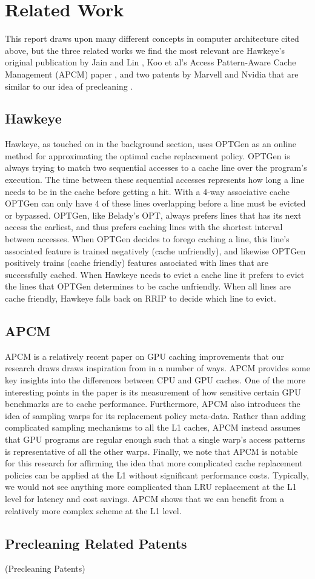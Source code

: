 \chapter{Related Work}

This report draws upon many different concepts in computer architecture cited above, but the three related works we find the most relevant are Hawkeye’s original publication by Jain and Lin \cite{hawkeye}, Koo et al’s Access Pattern-Aware Cache Management (APCM) paper \cite{apcm}, and two patents by Marvell and Nvidia that are similar to our idea of precleaning \cite{preclean_cpu,preclean_nvidia_patent}.

\section{Hawkeye}
Hawkeye, as touched on in the background section, uses OPTGen as an online method for approximating the optimal cache replacement policy. OPTGen is always trying to match two sequential accesses to a cache line over the program's execution. The time between these sequential accesses represents how long a line needs to be in the cache before getting a hit. With a 4-way associative cache OPTGen can only have 4 of these lines overlapping before a line must be evicted or bypassed. OPTGen, like Belady’s OPT, always prefers lines that has its next access the earliest, and thus prefers caching lines with the shortest interval between accesses. When OPTGen decides to forego caching a line, this line’s associated feature is trained negatively (cache unfriendly), and likewise OPTGen positively trains (cache friendly) features associated with lines that are successfully cached. When Hawkeye needs to evict a cache line it prefers to evict the lines that OPTGen determines to be cache unfriendly. When all lines are cache friendly, Hawkeye falls back on RRIP \cite{rrip} to decide which line to evict.

\section{APCM}
APCM is a relatively recent paper on GPU caching improvements that our research draws draws inspiration from in a number of ways. APCM provides some key insights into the differences between CPU and GPU caches. One of the more interesting points in the paper is its measurement of how sensitive certain GPU benchmarks are to cache performance. Furthermore, APCM also introduces the idea of sampling warps for its replacement policy meta-data. Rather than adding complicated sampling mechanisms to all the L1 caches, APCM instead assumes that GPU programs are regular enough such that a single warp's access patterns is representative of all the other warps. Finally, we note that APCM is notable for this research for affirming the idea that more complicated cache replacement policies can be applied at the L1 without significant performance costs. Typically, we would not see anything more complicated than LRU replacement at the L1 level for latency and cost savings. APCM shows that we can benefit from a relatively more complex scheme at the L1 level.

\section{Precleaning Related Patents}
(Precleaning Patents)
